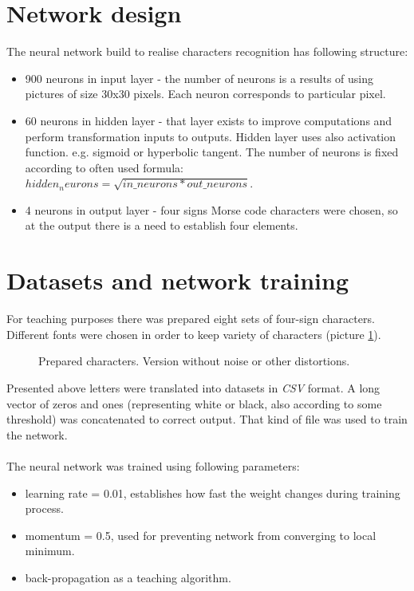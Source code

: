 \documentclass[eng,openany]{mgr}
\begin{document}
\section{Network design}
The neural network build to realise characters recognition has following structure:
\begin{itemize}
\item 900 neurons in input layer - the number of neurons is a results of using pictures of size 30x30 pixels. Each neuron corresponds to particular pixel.
\item 60 neurons in hidden layer - that layer exists to improve computations and perform transformation inputs to outputs. Hidden layer uses also activation function. e.g. sigmoid or hyperbolic tangent.
The number of neurons is fixed according to often used formula:\\ $hidden_neurons = \sqrt{in\_neurons * out\_neurons}$.
\item 4 neurons in output layer - four signs Morse code characters were chosen, so at the output there is a need to establish four elements.
\end{itemize}
\newpage
\section{Datasets and network training}

For teaching purposes there was prepared eight sets of four-sign characters. Different fonts were chosen in order to keep variety of characters (picture \ref{fig:alphabet}).
\begin{figure}[h]
\centering
\caption{Prepared characters. Version without noise or other distortions.}
\label{fig:alphabet}
\end{figure}
Presented above letters were translated into datasets in \textit{CSV} format. A long vector of zeros and ones (representing white or black, also according to some threshold) was concatenated to correct output. That kind of file was used to train the network.
\\
\\
The neural network was trained using following parameters:
\begin{itemize}
\item learning rate = 0.01, establishes how fast the weight changes during training process.
\item momentum = 0.5, used for preventing network from converging to local minimum.
\item back-propagation as a teaching algorithm.
\end{itemize}
\end{document}
